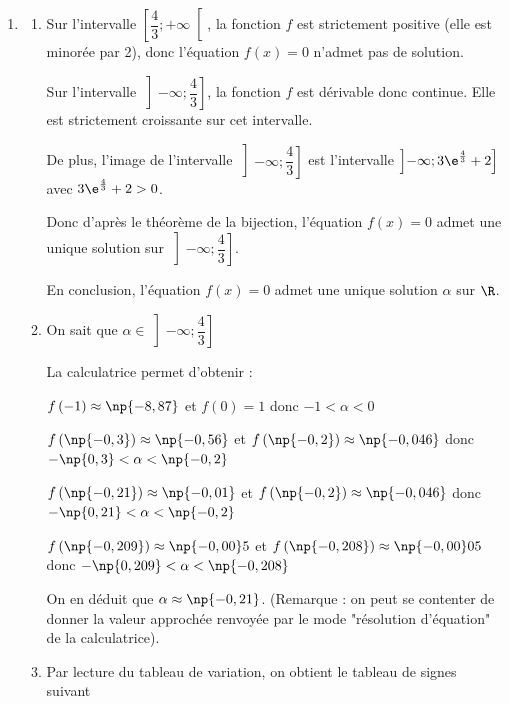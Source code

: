 \begin{enumerate}
		\item \begin{enumerate}
			\item Sur l'intervalle $\left[ \dfrac43 ; +\infty \right[$, la fonction $f$ est strictement positive (elle est minorée par 2), donc l'équation $f(x)=0$ n'admet pas de solution.

			Sur l'intervalle $\left] -\infty  ;\dfrac43 \right]$, la fonction $f$ est dérivable donc continue. Elle est strictement croissante sur cet intervalle.

			De plus, l'image de l'intervalle $\left] -\infty  ;\dfrac43 \right]$ est l'intervalle $\left] -\infty  ;3\e^{\frac43}+2 \right]$ avec $3\e^{\frac43}+2 >0$.

			Donc d'après le théorème de la bijection, l'équation $f(x)=0$ admet une unique solution sur $\left] -\infty  ;\dfrac43 \right]$.

			En conclusion, l'équation $f(x)=0$ admet une unique solution $\alpha$ sur $\R$.

			\item On sait que $\alpha \in \left] -\infty  ;\dfrac43 \right]$

			La calculatrice permet d'obtenir :

			$f \left(-1 \right) \approx \np{-8,87}$ et $f \left(0 \right)=1$ donc $-1 < \alpha < 0 $

			$f \left( \np{-0,3} \right) \approx \np{-0,56}$ et $f \left( \np{-0,2} \right) \approx \np{-0,046}$ donc $- \np{0,3} < \alpha < \np{-0,2} $

			$f \left( \np{-0,21} \right) \approx \np{-0,01}$ et $f \left( \np{-0,2} \right) \approx \np{-0,046}$ donc $- \np{0,21} < \alpha < \np{-0,2} $

			$f \left( \np{-0,209} \right) \approx \np{-0,00}5$ et $f \left( \np{-0,208} \right) \approx \np{-0,00}05$ donc $- \np{0,209} < \alpha < \np{-0,208} $

			On en déduit que $\alpha \approx \np{-0,21}$. (Remarque : on peut se contenter de donner la valeur approchée renvoyée par le mode "résolution d'équation" de la calculatrice).

			\item Par lecture du tableau de variation, on obtient le tableau de signes suivant
			\begin{center}
			\end{center}


\end{enumerate}
\end{enumerate}

